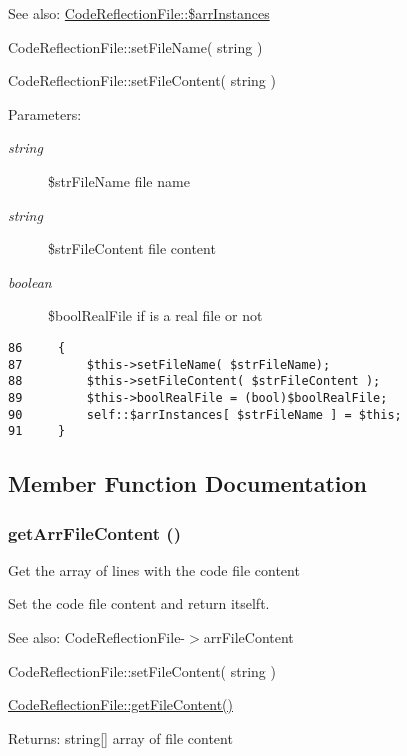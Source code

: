 \begin{Desc}
\item[See also:]\hyperlink{class_code_reflection_file_6bb6623babcf344a88383759b04b2b33}{CodeReflectionFile::\$arrInstances} 

CodeReflectionFile::setFileName( string ) 

CodeReflectionFile::setFileContent( string ) \end{Desc}
\begin{Desc}
\item[Parameters:]
\begin{description}
\item[{\em string}]\$strFileName file name \item[{\em string}]\$strFileContent file content \item[{\em boolean}]\$boolRealFile if is a real file or not \end{description}
\end{Desc}


\begin{Code}\begin{verbatim}86     {
87         $this->setFileName( $strFileName);
88         $this->setFileContent( $strFileContent );
89         $this->boolRealFile = (bool)$boolRealFile;
90         self::$arrInstances[ $strFileName ] = $this;
91     }
\end{verbatim}
\end{Code}




\subsection{Member Function Documentation}
\hypertarget{class_code_reflection_file_547f53cf60e90cb214810882a83b8ee1}{
\subsubsection[{getArrFileContent}]{\setlength{\rightskip}{0pt plus 5cm}getArrFileContent ()}}
\label{class_code_reflection_file_547f53cf60e90cb214810882a83b8ee1}


Get the array of lines with the code file content

Set the code file content and return itselft.

\begin{Desc}
\item[See also:]CodeReflectionFile-$>$arrFileContent 

CodeReflectionFile::setFileContent( string ) 

\hyperlink{class_code_reflection_file_df23cc1c442ffc832d008858b5c9cc48}{CodeReflectionFile::getFileContent()} \end{Desc}
\begin{Desc}
\item[Returns:]string\mbox{[}\mbox{]} array of file content \end{Desc}


